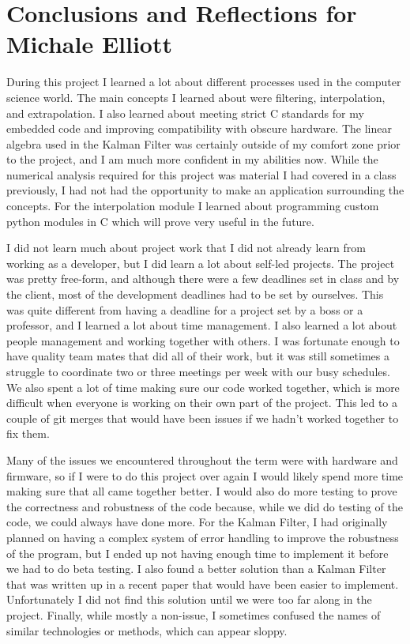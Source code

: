 \documentclass[onecolumn, draftclsnofoot,10pt, compsoc]{IEEEtran}
\begin{document}
\section{Conclusions and Reflections for Michale Elliott}
During this project I learned a lot about different processes used in the computer science world.
The main concepts I learned about were filtering, interpolation, and extrapolation.
I also learned about meeting strict C standards for my embedded code and improving compatibility with obscure hardware.
The linear algebra used in the Kalman Filter was certainly outside of my comfort zone prior to the project, and I am much more confident in my abilities now.
While the numerical analysis required for this project was material I had covered in a class previously, I had not had the opportunity to make an application surrounding the concepts.
For the interpolation module I learned about programming custom python modules in C which will prove very useful in the future.

I did not learn much about project work that I did not already learn from working as a developer, but I did learn a lot about self-led projects.
The project was pretty free-form, and although there were a few deadlines set in class and by the client, most of the development deadlines had to be set by ourselves.
This was quite different from having a deadline for a project set by a boss or a professor, and I learned a lot about time management.
I also learned a lot about people management and working together with others.
I was fortunate enough to have quality team mates that did all of their work, but it was still sometimes a struggle to coordinate two or three meetings per week with our busy schedules.
We also spent a lot of time making sure our code worked together, which is more difficult when everyone is working on their own part of the project.
This led to a couple of git merges that would have been issues if we hadn't worked together to fix them.

Many of the issues we encountered throughout the term were with hardware and firmware, so if I were to do this project over again I would likely spend more time making sure that all came together better.
I would also do more testing to prove the correctness and robustness of the code because, while we did do testing of the code, we could always have done more.
For the Kalman Filter, I had originally planned on having a complex system of error handling to improve the robustness of the program, but I ended up not having enough time to implement it before we had to do beta testing.
I also found a better solution than a Kalman Filter that was written up in a recent paper that would have been easier to implement.
Unfortunately I did not find this solution until we were too far along in the project.
Finally, while mostly a non-issue, I sometimes confused the names of similar technologies or methods, which can appear sloppy.
\end{document}
